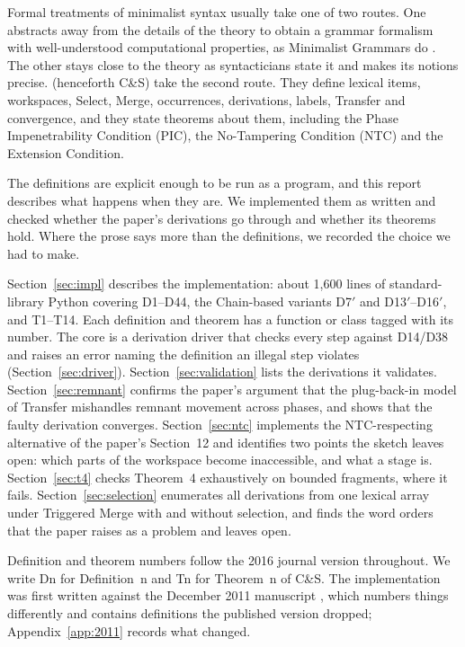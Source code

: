 \documentclass[11pt]{article}
\newcommand{\Def}[1]{D#1}
\newcommand{\Thm}[1]{T#1}
\theoremstyle{definition}
\theoremstyle{plain}
\begin{document}
Formal treatments of minimalist syntax usually take one of two routes. One
abstracts away from the details of the theory to obtain a grammar formalism
with well-understood computational properties, as Minimalist Grammars do
\citep{Stabler1997,Stabler2011}. The other stays close to the theory as
syntacticians state it and makes its notions precise.
\citet{CollinsStabler2016} (henceforth C\&S) take the second route. They
define lexical items, workspaces, Select, Merge, occurrences, derivations,
labels, Transfer and convergence, and they state theorems about them,
including the Phase Impenetrability Condition (PIC), the No-Tampering
Condition (NTC) and the Extension Condition.

The definitions are explicit enough to be run as a program, and this report
describes what happens when they are. We implemented them as written and
checked whether the paper's derivations go through and whether its theorems
hold. Where the prose says more than the definitions, we recorded the choice
we had to make.

Section~\ref{sec:impl} describes the implementation: about 1{,}600 lines of
standard-library Python covering \Def{1}--\Def{44}, the Chain-based variants
\Def{7}$'$ and \Def{13}$'$--\Def{16}$'$, and \Thm{1}--\Thm{14}. Each definition
and theorem has a function or class tagged with its number. The core is a
derivation driver that checks every step against \Def{14}/\Def{38} and
raises an error naming the definition an illegal step violates
(Section~\ref{sec:driver}). Section~\ref{sec:validation} lists the
derivations it validates. Section~\ref{sec:remnant} confirms the paper's
argument that the plug-back-in model of Transfer mishandles remnant movement
across phases, and shows that the faulty derivation converges.
Section~\ref{sec:ntc} implements the NTC-respecting alternative of the
paper's Section~12 and identifies two points the sketch leaves open: which
parts of the workspace become inaccessible, and what a stage is.
Section~\ref{sec:t4} checks Theorem~4 exhaustively on bounded fragments,
where it fails. Section~\ref{sec:selection} enumerates all derivations from
one lexical array under Triggered Merge with and without selection, and finds
the word orders that the paper raises as a problem and leaves open.

Definition and theorem numbers follow the 2016 journal version throughout. We
write \Def{n} for Definition~n and \Thm{n} for Theorem~n of C\&S. The
implementation was first written against the December 2011 manuscript
\citep{CollinsStabler2011}, which numbers things differently and contains
definitions the published version dropped; Appendix~\ref{app:2011} records
what changed.
\end{document}
